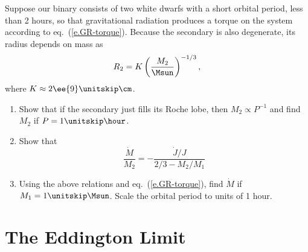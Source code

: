 \begin{exercisebox}
Suppose our binary consists of two white dwarfs with a short orbital period, less than 2 hours, so that gravitational radiation produces a torque on the system according to eq.~(\ref{e.GR-torque}).  Because the secondary is also degenerate, its radius depends on mass as
\[ R_{2} = K \left(\frac{M_{2}}{\Msun}\right)^{-1/3}, \]
where $K \approx 2\ee{9}\nsp\cm$.
\begin{enumerate}
\item Show that if the secondary just fills its Roche lobe, then $M_{2} \propto P^{-1}$ and find $M_{2}$ if $P = 1\nsp\hour$.
\item Show that
\[ \frac{\dot{M}}{M_{2}} = - \frac{\dot{J}/J}{2/3 - M_{2}/M_{1}} \]
\item Using the above relations and eq.~(\ref{e.GR-torque}), find $\dot{M}$ if $M_{1} = 1\nsp\Msun$. Scale the orbital period to units of 1 hour.
\end{enumerate}
\end{exercisebox}

\section{The Eddington Limit}

